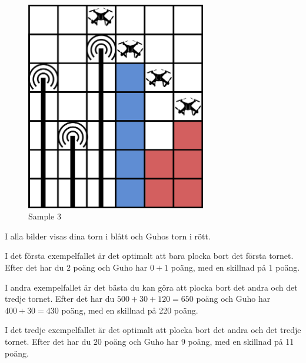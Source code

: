 \begin{figure}
  \begin{minipage}{.3\textwidth}
    \centering
    \includegraphics[width=0.7\textwidth]{sample3.png}
    \caption{Sample 3}
    \label{fig:test3}
  \end{minipage}
\end{figure}
I alla bilder visas dina torn i blått och Guhos torn i rött.

I det första exempelfallet är det optimalt att bara plocka bort det första tornet. Efter det har du $2$ poäng och Guho har $0+1$ poäng, med en skillnad på 1 poäng.

I andra exempelfallet är det bästa du kan göra att plocka bort det andra och det tredje tornet. Efter det har du $500+30+120=650$ poäng och Guho har $400+30=430$ poäng, med en skillnad på 220 poäng.

I det tredje exempelfallet är det optimalt att plocka bort det andra och det tredje tornet. Efter det har du $20$ poäng och Guho har $9$ poäng, med en skillnad på 11 poäng.